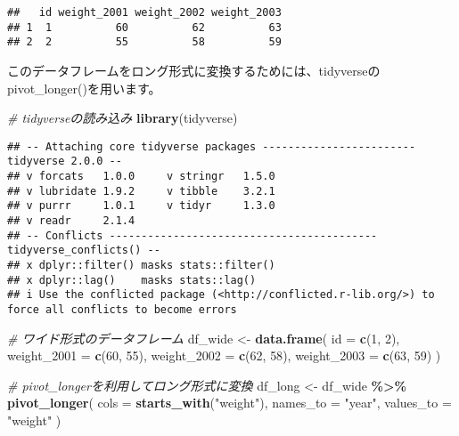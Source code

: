 \documentclass[
]{article}
\newenvironment{Shaded}{\begin{snugshade}}{\end{snugshade}}
\newcommand{\AttributeTok}[1]{\textcolor[rgb]{0.13,0.29,0.53}{#1}}
\newcommand{\CommentTok}[1]{\textcolor[rgb]{0.56,0.35,0.01}{\textit{#1}}}
\newcommand{\DecValTok}[1]{\textcolor[rgb]{0.00,0.00,0.81}{#1}}
\newcommand{\FunctionTok}[1]{\textcolor[rgb]{0.13,0.29,0.53}{\textbf{#1}}}
\newcommand{\NormalTok}[1]{#1}
\newcommand{\OtherTok}[1]{\textcolor[rgb]{0.56,0.35,0.01}{#1}}
\newcommand{\SpecialCharTok}[1]{\textcolor[rgb]{0.81,0.36,0.00}{\textbf{#1}}}
\newcommand{\StringTok}[1]{\textcolor[rgb]{0.31,0.60,0.02}{#1}}
\begin{document}
\begin{verbatim}
##   id weight_2001 weight_2002 weight_2003
## 1  1          60          62          63
## 2  2          55          58          59
\end{verbatim}

このデータフレームをロング形式に変換するためには、tidyverseのpivot\_longer()を用います。

\begin{Shaded}
\begin{Highlighting}[]
\CommentTok{\# tidyverseの読み込み}
\FunctionTok{library}\NormalTok{(tidyverse)}
\end{Highlighting}
\end{Shaded}

\begin{verbatim}
## -- Attaching core tidyverse packages ------------------------ tidyverse 2.0.0 --
## v forcats   1.0.0     v stringr   1.5.0
## v lubridate 1.9.2     v tibble    3.2.1
## v purrr     1.0.1     v tidyr     1.3.0
## v readr     2.1.4     
## -- Conflicts ------------------------------------------ tidyverse_conflicts() --
## x dplyr::filter() masks stats::filter()
## x dplyr::lag()    masks stats::lag()
## i Use the conflicted package (<http://conflicted.r-lib.org/>) to force all conflicts to become errors
\end{verbatim}

\begin{Shaded}
\begin{Highlighting}[]
\CommentTok{\# ワイド形式のデータフレーム}
\NormalTok{df\_wide }\OtherTok{\textless{}{-}} \FunctionTok{data.frame}\NormalTok{(}
  \AttributeTok{id =} \FunctionTok{c}\NormalTok{(}\DecValTok{1}\NormalTok{, }\DecValTok{2}\NormalTok{),}
  \AttributeTok{weight\_2001 =} \FunctionTok{c}\NormalTok{(}\DecValTok{60}\NormalTok{, }\DecValTok{55}\NormalTok{),}
  \AttributeTok{weight\_2002 =} \FunctionTok{c}\NormalTok{(}\DecValTok{62}\NormalTok{, }\DecValTok{58}\NormalTok{),}
  \AttributeTok{weight\_2003 =} \FunctionTok{c}\NormalTok{(}\DecValTok{63}\NormalTok{, }\DecValTok{59}\NormalTok{)}
\NormalTok{)}
\end{Highlighting}
\end{Shaded}

\begin{Shaded}
\begin{Highlighting}[]
\CommentTok{\# pivot\_longerを利用してロング形式に変換}
\NormalTok{df\_long }\OtherTok{\textless{}{-}}\NormalTok{ df\_wide }\SpecialCharTok{\%\textgreater{}\%}
  \FunctionTok{pivot\_longer}\NormalTok{(}
    \AttributeTok{cols =} \FunctionTok{starts\_with}\NormalTok{(}\StringTok{"weight"}\NormalTok{),}
    \AttributeTok{names\_to =} \StringTok{"year"}\NormalTok{,}
    \AttributeTok{values\_to =} \StringTok{"weight"}
\NormalTok{  )}
\end{Highlighting}
\end{Shaded}
\end{document}
